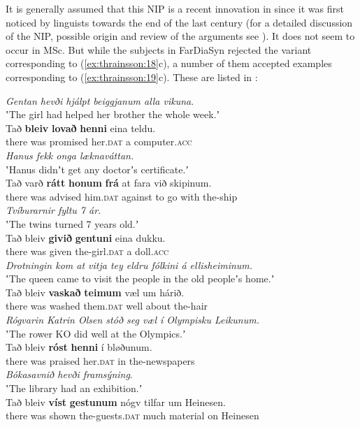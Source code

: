 \documentclass[output=paper]{LSP/langsci}
\begin{document}
It is generally assumed that this NIP is a recent innovation in  since it was first noticed by linguists towards the end of the last century (for a detailed discussion of the NIP, possible origin and review of the arguments see \citealt{Sigurðsson2012}). It does not seem to occur in MSc. But while the subjects in FarDiaSyn rejected the variant corresponding to (\ref{ex:thrainsson:18}c), a number of them accepted examples corresponding to (\ref{ex:thrainsson:19}c). These are listed in :

\ea%
    \label{ex:Thrainsson:20}
    \ea
    \textit{Gentan hevði hjálpt beiggjanum alla vikuna}.\\
    \glt ʽThe girl had helped her brother the whole week.ʼ\\
    \gll Tað   \textbf{bleiv}   \textbf{lovað}     \textbf{henni}   eina teldu.\\
         there  was  promised her\textsc{.dat}   a computer\textsc{.acc}\\
    \ex \textit{  Hanus fekk onga læknaváttan.}\\
    \glt ʽHanus didnʼt get any doctorʼs certificate.ʼ\\
    \gll Tað   varð   \textbf{rátt}     \textbf{honum}   \textbf{frá}     at fara   við   skipinum.\\
          there  was  advised  him\textsc{.dat}  against  to go    with  the-ship\\
    \ex   \textit{Tvíburarnir fyltu 7 ár.}\\
    \glt   ʽThe twins turned 7 years old.ʼ\\
    \gll  Tað   bleiv   \textbf{givið}   \textbf{gentuni}     eina dukku.  \\
          there  was  given  the-girl\textsc{.dat}  a doll\textsc{.acc}\\
    \ex \textit{Drotningin kom at vitja tey eldru fólkini á ellisheiminum.}\\
	\glt ʽThe queen came to visit the people in the old peopleʼs home.ʼ\\
	\gll         Tað   bleiv   \textbf{vaskað}   \textbf{teimum} væl   um     hárið.\\
	         there  was  washed  them\textsc{.dat}   well   about     the-hair\\
	\ex \textit{Rógvarin Katrin Olsen stóð seg væl í Olympisku Leikunum.}\\
	\glt      ʽThe rower KO did well at the Olympics.ʼ\\
	\gll  Tað   bleiv   \textbf{róst}     \textbf{henni}   í bløðunum.\\
          there  was  praised  her\textsc{.dat}  in the-newspapers\\
	\ex \textit{Bókasavnið hevði framsýning}.\\
    \glt   ʽThe library had an exhibition.ʼ\\
    \gll Tað   bleiv   \textbf{víst}     \textbf{gestunum} nógv   tilfar     um Heinesen.\\
          there  was  shown  the-guests\textsc{.dat}  much  material  on Heinesen\\
    \z
\z
\end{document}
